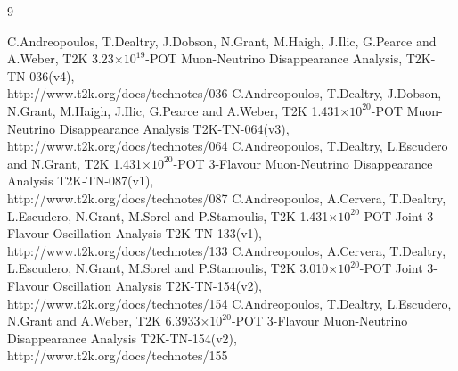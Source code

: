%
%

\begin{thebibliography}{9}

%
%
   C.Andreopoulos, T.Dealtry, J.Dobson, N.Grant, M.Haigh, J.Ilic, G.Pearce and A.Weber,
   T2K 3.23$\times10^{19}$-POT Muon-Neutrino Disappearance Analysis,
   T2K-TN-036(v4),\\
   http://www.t2k.org/docs/technotes/036
   C.Andreopoulos, T.Dealtry, J.Dobson, N.Grant, M.Haigh, J.Ilic, G.Pearce and A.Weber,
   T2K 1.431$\times10^{20}$-POT Muon-Neutrino Disappearance Analysis
   T2K-TN-064(v3),\\
   http://www.t2k.org/docs/technotes/064
   C.Andreopoulos, T.Dealtry, L.Escudero and N.Grant,
   T2K 1.431$\times10^{20}$-POT 3-Flavour Muon-Neutrino Disappearance Analysis
   T2K-TN-087(v1),\\
   http://www.t2k.org/docs/technotes/087
   C.Andreopoulos, A.Cervera, T.Dealtry, L.Escudero, N.Grant, M.Sorel and P.Stamoulis,
   T2K 1.431$\times10^{20}$-POT Joint 3-Flavour Oscillation Analysis
   T2K-TN-133(v1),\\
   http://www.t2k.org/docs/technotes/133
   C.Andreopoulos, A.Cervera, T.Dealtry, L.Escudero, N.Grant, M.Sorel and P.Stamoulis,
   T2K 3.010$\times10^{20}$-POT Joint 3-Flavour Oscillation Analysis
   T2K-TN-154(v2),\\
   http://www.t2k.org/docs/technotes/154
   C.Andreopoulos, T.Dealtry, L.Escudero, N.Grant and A.Weber,
   T2K 6.3933$\times10^{20}$-POT 3-Flavour Muon-Neutrino Disappearance Analysis
   T2K-TN-154(v2),\\
   http://www.t2k.org/docs/technotes/155


\end{thebibliography}
